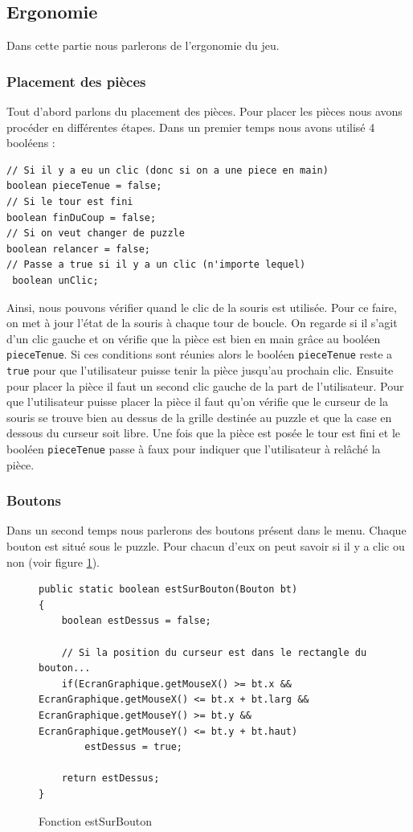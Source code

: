 \documentclass[]{article}
\newcommand{\variable}[1]{\noindent \texttt{#1}}
\begin{document}
\newpage
\subsection{Ergonomie}

Dans cette partie nous parlerons de l'ergonomie du jeu.
\subsubsection{Placement des pièces}
Tout d'abord parlons du placement des pièces.
Pour placer les pièces nous avons procéder en différentes étapes. Dans un premier temps nous avons utilisé 4 booléens : 
\begin{lstlisting}
// Si il y a eu un clic (donc si on a une piece en main)
boolean pieceTenue = false;
// Si le tour est fini
boolean finDuCoup = false;
// Si on veut changer de puzzle
boolean relancer = false;
// Passe a true si il y a un clic (n'importe lequel)
 boolean unClic;
\end{lstlisting}

Ainsi, nous pouvons vérifier quand le clic de la souris est utilisée. 
Pour ce faire, on met à jour l'état de la souris à chaque tour de boucle. On regarde si il s'agit d'un clic gauche et on vérifie que la pièce est bien en main grâce au booléen \variable{pieceTenue}. Si ces conditions sont réunies alors le booléen \variable{pieceTenue} reste a \variable{true} pour que l'utilisateur puisse tenir la pièce jusqu'au prochain clic. Ensuite pour placer la pièce il faut un second clic gauche de la part de  l'utilisateur.
Pour que l'utilisateur puisse placer la pièce il faut qu'on vérifie que le curseur de la souris se trouve bien au dessus de la grille destinée au puzzle et que la case en dessous du curseur soit libre. Une fois que la pièce est posée le tour est fini et le booléen \variable{pieceTenue} passe à faux pour indiquer que l'utilisateur à relâché la pièce.

\subsubsection{Boutons}
Dans un second temps nous parlerons des boutons présent dans le menu. 
Chaque bouton est situé sous le puzzle.  Pour chacun d'eux on peut savoir si il y a clic ou non (voir figure \no\ref{Fonction estSurBouton}).

\begin{figure}[hpt]
	\center
	\caption{\label{Fonction estSurBouton} Fonction estSurBouton}
\begin{lstlisting}
public static boolean estSurBouton(Bouton bt)
{
    boolean estDessus = false;

    // Si la position du curseur est dans le rectangle du bouton...
    if(EcranGraphique.getMouseX() >= bt.x && EcranGraphique.getMouseX() <= bt.x + bt.larg && EcranGraphique.getMouseY() >= bt.y && EcranGraphique.getMouseY() <= bt.y + bt.haut)
        estDessus = true;

    return estDessus;
}
\end{lstlisting}
\end{figure}
\end{document}
